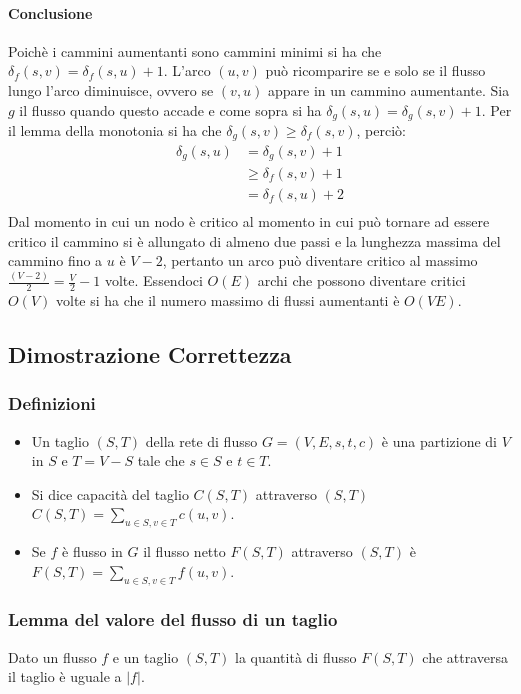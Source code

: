 \paragraph{Conclusione}
Poich\`e i cammini aumentanti sono cammini minimi si ha che $\delta_f(s, v) = \delta_f(s, u)+1$. L'arco $(u, v)$ pu\`o ricomparire se e solo se il flusso lungo l'arco diminuisce, ovvero
se $(v, u)$ appare in un cammino aumentante. Sia $g$ il flusso quando questo accade e come sopra si ha $\delta_g(s, u) = \delta_g(s, v)+1$. Per il lemma della monotonia si ha che
$\delta_g(s, v)\ge \delta_f(s, v)$, perci\`o:
\begin{align*}
	\delta_g(s, u) & = \delta_g(s, v)+1\\
		       & \ge \delta_f(s, v)+1\\
		       & = \delta_f(s, u)+2\\
\end{align*}
Dal momento in cui un nodo \`e critico al momento in cui pu\`o tornare ad essere critico il cammino si \`e allungato di almeno due passi e la lunghezza massima del cammino fino a $u$ \`e
$V-2$, pertanto un arco pu\`o diventare critico al massimo $\frac{(V-2)}{2}=\frac{V}{2}-1$ volte. Essendoci $O(E)$ archi che possono diventare critici $O(V)$ volte si ha che il numero
massimo di flussi aumentanti \`e $O(VE)$.
\subsection{Dimostrazione Correttezza}
\subsubsection{Definizioni}
\begin{itemize}
	\item Un taglio $(S, T)$ della rete di flusso $G=(V, E, s, t, c)$ \`e una partizione di $V$ in $S$ e $T=V-S$ tale che $s\in S$ e $t\in T$. 
	\item Si dice capacit\`a del taglio $C(S, T)$ attraverso $(S, T)$ $C(S, T) = \sum\limits_{u\in S, v\in T}c(u, v)$.
	\item Se $f$ \`e flusso in $G$ il flusso netto $F(S, T)$ attraverso $(S, T)$ \`e $F(S, T) = \sum\limits_{u\in S, v\in T} f(u, v)$.
\end{itemize}
\subsubsection{Lemma del valore del flusso di un taglio}
Dato un flusso $f$ e un taglio $(S, T)$ la quantit\`a di flusso $F(S, T)$ che attraversa il taglio \`e uguale a $|f|$. 

